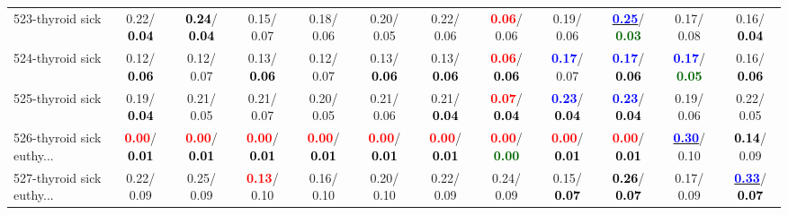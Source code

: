 \begin{table}[h]
\begin{center}
{\begin{tabular}{lc|c|c|c|c|c|c|c|c|c|c}
523-thyroid sick &   0.22/\textcolor{black}{\textbf{  0.04}} & \textcolor{black}{\textbf{  0.24}}/\textcolor{black}{\textbf{  0.04}} &   0.15/  0.07 &   0.18/  0.06 &   0.20/  0.05 &   0.22/  0.06 & \textcolor{red}{\textbf{  0.06}}/  0.06 &   0.19/  0.06 & \underline{\textcolor{blue}{\textbf{  0.25}}}/\textcolor{darkgreen}{\textbf{  0.03}} &   0.17/  0.08 &   0.16/\textcolor{black}{\textbf{  0.04}} \\
524-thyroid sick &   0.12/\textcolor{black}{\textbf{  0.06}} &   0.12/  0.07 &   0.13/\textcolor{black}{\textbf{  0.06}} &   0.12/  0.07 &   0.13/\textcolor{black}{\textbf{  0.06}} &   0.13/\textcolor{black}{\textbf{  0.06}} & \textcolor{red}{\textbf{  0.06}}/\textcolor{black}{\textbf{  0.06}} & \textcolor{blue}{\textbf{  0.17}}/  0.07 & \textcolor{blue}{\textbf{  0.17}}/\textcolor{black}{\textbf{  0.06}} & \textcolor{blue}{\textbf{  0.17}}/\textcolor{darkgreen}{\textbf{  0.05}} &   0.16/\textcolor{black}{\textbf{  0.06}} \\
525-thyroid sick &   0.19/\textcolor{black}{\textbf{  0.04}} &   0.21/  0.05 &   0.21/  0.07 &   0.20/  0.05 &   0.21/  0.06 &   0.21/\textcolor{black}{\textbf{  0.04}} & \textcolor{red}{\textbf{  0.07}}/\textcolor{black}{\textbf{  0.04}} & \textcolor{blue}{\textbf{  0.23}}/\textcolor{black}{\textbf{  0.04}} & \textcolor{blue}{\textbf{  0.23}}/\textcolor{black}{\textbf{  0.04}} &   0.19/  0.06 &   0.22/  0.05 \\
526-thyroid sick euthy... & \textcolor{red}{\textbf{  0.00}}/\textcolor{black}{\textbf{  0.01}} & \textcolor{red}{\textbf{  0.00}}/\textcolor{black}{\textbf{  0.01}} & \textcolor{red}{\textbf{  0.00}}/\textcolor{black}{\textbf{  0.01}} & \textcolor{red}{\textbf{  0.00}}/\textcolor{black}{\textbf{  0.01}} & \textcolor{red}{\textbf{  0.00}}/\textcolor{black}{\textbf{  0.01}} & \textcolor{red}{\textbf{  0.00}}/\textcolor{black}{\textbf{  0.01}} & \textcolor{red}{\textbf{  0.00}}/\textcolor{darkgreen}{\textbf{  0.00}} & \textcolor{red}{\textbf{  0.00}}/\textcolor{black}{\textbf{  0.01}} & \textcolor{red}{\textbf{  0.00}}/\textcolor{black}{\textbf{  0.01}} & \underline{\textcolor{blue}{\textbf{  0.30}}}/  0.10 & \textcolor{black}{\textbf{  0.14}}/  0.09 \\ \hline
527-thyroid sick euthy... &   0.22/  0.09 &   0.25/  0.09 & \textcolor{red}{\textbf{  0.13}}/  0.10 &   0.16/  0.10 &   0.20/  0.10 &   0.22/  0.09 &   0.24/  0.09 &   0.15/\textcolor{black}{\textbf{  0.07}} & \textcolor{black}{\textbf{  0.26}}/\textcolor{black}{\textbf{  0.07}} &   0.17/  0.09 & \underline{\textcolor{blue}{\textbf{  0.33}}}/\textcolor{black}{\textbf{  0.07}} \\

\end{tabular}}
\end{center}
\end{table}
